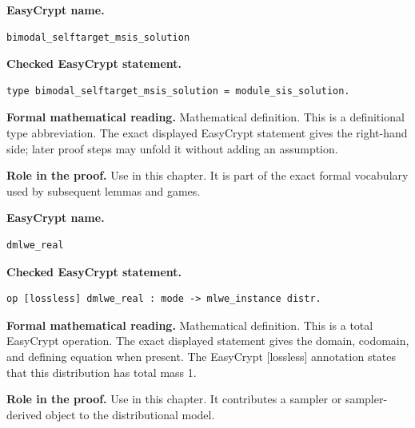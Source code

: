 \begin{formaldefinition}
\noindent\textbf{EasyCrypt name.}
\begin{lstlisting}[language=EasyCrypt,basicstyle=\ttfamily\scriptsize]
bimodal_selftarget_msis_solution
\end{lstlisting}
\noindent\textbf{Checked EasyCrypt statement.}
\begin{lstlisting}[language=EasyCrypt,basicstyle=\ttfamily\scriptsize]
type bimodal_selftarget_msis_solution = module_sis_solution.
\end{lstlisting}
\noindent\textbf{Formal mathematical reading.}
Mathematical definition. This is a definitional type abbreviation.  The exact displayed EasyCrypt statement gives the right-hand side; later proof steps may unfold it without adding an assumption.

\noindent\textbf{Role in the proof.}
Use in this chapter. It is part of the exact formal vocabulary used by subsequent lemmas and games.

\end{formaldefinition}

\begin{formaldefinition}
\noindent\textbf{EasyCrypt name.}
\begin{lstlisting}[language=EasyCrypt,basicstyle=\ttfamily\scriptsize]
dmlwe_real
\end{lstlisting}
\noindent\textbf{Checked EasyCrypt statement.}
\begin{lstlisting}[language=EasyCrypt,basicstyle=\ttfamily\scriptsize]
op [lossless] dmlwe_real : mode -> mlwe_instance distr.
\end{lstlisting}
\noindent\textbf{Formal mathematical reading.}
Mathematical definition. This is a total EasyCrypt operation.  The exact displayed statement gives the domain, codomain, and defining equation when present.  The EasyCrypt [lossless] annotation states that this distribution has total mass 1.

\noindent\textbf{Role in the proof.}
Use in this chapter. It contributes a sampler or sampler-derived object to the distributional model.

\end{formaldefinition}

